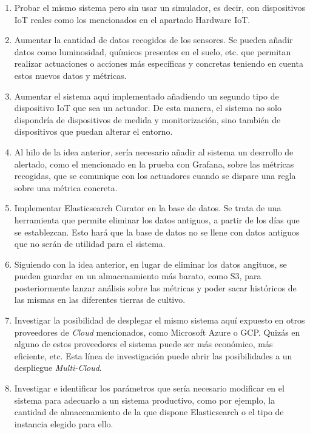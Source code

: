 \documentclass[../../memoria.tex]{subfiles}
\begin{document}
\begin{enumerate}
    \item Probar el mismo sistema pero sin usar un simulador, es decir, con dispositivos IoT reales como los mencionados en el apartado Hardware IoT.

    \item Aumentar la cantidad de datos recogidos de los sensores. Se pueden añadir datos como luminosidad, químicos presentes en el suelo, etc. que permitan realizar actuaciones o acciones más específicas y concretas teniendo en cuenta estos nuevos datos y métricas.

    \item Aumentar el sistema aquí implementado añadiendo un segundo tipo de dispositivo IoT que sea un actuador. De esta manera, el sistema no solo dispondría de dispositivos de medida y monitorización, sino también de dispositivos que puedan alterar el entorno.

    \item Al hilo de la idea anterior, sería necesario añadir al sistema un desrrollo de alertado, como el mencionado en la prueba con Grafana, sobre las métricas recogidas, que se comunique con los actuadores cuando se dispare una regla sobre una métrica concreta.

    \item Implementar Elasticsearch Curator \cite{elasticsearchcurator} en la base de datos. Se trata de una herramienta que permite eliminar los datos antiguos, a partir de los días que se establezcan. Esto hará que la base de datos no se llene con datos antiguos que no serán de utilidad para el sistema.

    \item Siguiendo con la idea anterior, en lugar de eliminar los datos angituos, se pueden guardar en un almacenamiento más barato, como S3, para posteriormente lanzar análisis sobre las métricas y poder sacar históricos de las mismas en las diferentes tierras de cultivo.

    \item Investigar la posibilidad de desplegar el mismo sistema aquí expuesto en otros proveedores de \textit{Cloud} mencionados, como Microsoft Azure o GCP. Quizás en alguno de estos proveedores el sistema puede ser más económico, más eficiente, etc. Esta línea de investigación puede abrir las posibilidades a un despliegue \textit{Multi-Cloud}.

    \item Investigar e identificar los parámetros que sería necesario modificar en el sistema para adecuarlo a un sistema productivo, como por ejemplo, la cantidad de almacenamiento de la que dispone Elasticsearch o el tipo de instancia elegido para ello.
\end{enumerate}
\end{document}
